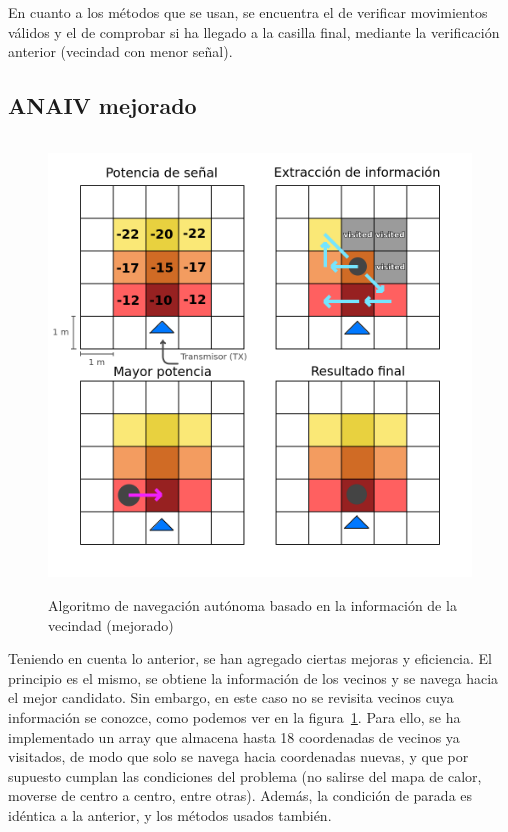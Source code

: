 En cuanto a los métodos que se usan, se encuentra el de verificar movimientos válidos y el de comprobar si ha llegado a la casilla final, mediante la verificación anterior (vecindad con menor señal).\\

\subsection{\ac{ANAIV} mejorado}
\label{subsec:alg-manual-opt}

\begin{figure} [tp]
    \begin{center}
    \includegraphics[height=12cm]{imagenes/cap4/10_algoritmo_optimizado.png}
    \end{center}
    \caption[Algoritmo de navegación autónoma basado en la información de la vecindad (mejorado)]{Algoritmo de navegación autónoma basado en la información de la vecindad (mejorado)}
    \label{fig:opt_algorithm}
\end{figure}

Teniendo en cuenta lo anterior, se han agregado ciertas mejoras y eficiencia. El principio es el mismo, se obtiene la información de los vecinos y se navega hacia el mejor candidato. Sin embargo, en este caso no se revisita vecinos cuya información se conozce, como podemos ver en la figura~\ref{fig:opt_algorithm}. Para ello, se ha implementado un array que almacena hasta 18 coordenadas de vecinos ya visitados, de modo que solo se navega hacia coordenadas nuevas, y que por supuesto cumplan las condiciones del problema (no salirse del mapa de calor, moverse de centro a centro, entre otras). Además, la condición de parada es idéntica a la anterior, y los métodos usados también.\\

